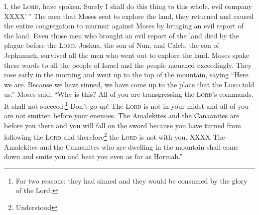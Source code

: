 \begin{enumerate*}[mode=unboxed]
     I, the \textsc{Lord}, have spoken. Surely I shall do this thing to this whole, evil company XXXX'\,''%
     The men that Moses sent to explore the land, they returned and caused the entire congregation to murmur against Moses by bringing an evil report of the land.%
     Even those men who brought an evil report of the land died by the plague before the \textsc{Lord}.%
     Joshua, the son of Nun, and Caleb, the son of Jephunneh, survived all the men who went out to explore the land.%
     Moses spake these words to all the people of Israel and the people mourned exceedingly.%
     They rose early in the morning and went up to the top of the mountain, saying ``Here we are. Because we have sinned, we have come up to the place that the \textsc{Lord} told us.''%
     Moses said, ``Why is this? All of you are transgressing the \textsc{Lord}'s commands. It shall not succeed.\footnote{For two reasons: they had sinned and they would be consumed by the glory of the Lord.}%
     Don't go up! The \textsc{Lord} is not in your midst and all of you are not smitten before your enemies.%
     The Amalekites and the Canaanites are before you there and you will fall on the sword because you have turned from following the \textsc{Lord} and therefore\footnote{Understood} the \textsc{Lord} is not with you.%
     XXXX%
     The Amalekites and the Canaanites who are dwelling in the mountain shall come down and smite you and beat you even as far as Hormah.''%
\end{enumerate*}
